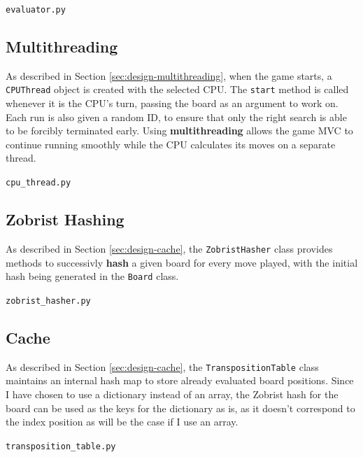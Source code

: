\documentclass[../main/main.tex]{subfiles}
\begin{document}
\noindent\verb|evaluator.py|


\subsection{Multithreading}
As described in Section \ref{sec:design-multithreading}, when the game starts, a \lstinline{CPUThread} object is created with the selected CPU. The \lstinline{start} method is called whenever it is the CPU's turn, passing the board as an argument to work on. Each run is also given a random ID, to ensure that only the right search is able to be forcibly terminated early. Using \textbf{multithreading} allows the game MVC to continue running smoothly while the CPU calculates its moves on a separate thread.

\noindent\verb|cpu_thread.py|
\label{sec:cpu-thread}


\subsection{Zobrist Hashing}
\label{sec:zobrist-hashing}
As described in Section \ref{sec:design-cache}, the \lstinline{ZobristHasher} class provides methods to successivly \textbf{hash} a given board for every move played, with the initial hash being generated in the \lstinline{Board} class.

\noindent\verb|zobrist_hasher.py|


\subsection{Cache}
As described in Section \ref{sec:design-cache}, the \lstinline{TranspositionTable} class maintains an internal hash map to store already evaluated board positions. Since I have chosen to use a dictionary instead of an array, the Zobrist hash for the board can be used as the keys for the dictionary as is, as it doesn't correspond to the index position as will be the case if I use an array.

\noindent\verb|transposition_table.py|

\end{document}
